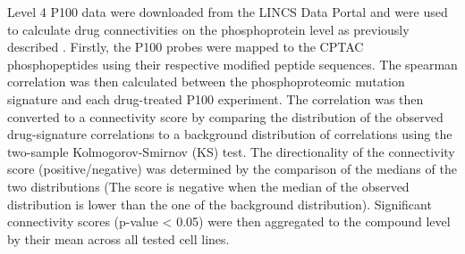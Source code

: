 Level 4 P100 data were downloaded from the LINCS Data Portal \cite{stathiasv_schurersc:LINCSData2019} and were used to calculate drug connectivities on the phosphoprotein level as previously described \cite{litichevskiyl_jaffejd:LibraryPhosphoproteomic2018}. Firstly, the P100 probes were mapped to the CPTAC phosphopeptides using their respective modified peptide sequences. The spearman correlation was then calculated between the phosphoproteomic mutation signature and each drug-treated P100 experiment. The correlation was then converted to a connectivity score by comparing the distribution of the observed drug-signature correlations to a background distribution of correlations using the two-sample Kolmogorov-Smirnov (KS) test. The directionality of the connectivity score (positive/negative) was determined by the comparison of the medians of the two distributions (The score is negative when the median of the observed distribution is lower than the one of the background distribution). Significant connectivity scores (p-value < 0.05) were then aggregated to the compound level by their mean across all tested cell lines.

